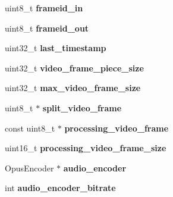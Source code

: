\begin{DoxyCompactItemize}
\item 
\hypertarget{struct___c_s_session_affc5ab5608c4d2dea8513fdc2b2cd6e6}{uint8\+\_\+t {\bfseries frameid\+\_\+in}}\label{struct___c_s_session_affc5ab5608c4d2dea8513fdc2b2cd6e6}

\item 
\hypertarget{struct___c_s_session_acea7b9bf7e58ed8e24980edeaacecc25}{uint8\+\_\+t {\bfseries frameid\+\_\+out}}\label{struct___c_s_session_acea7b9bf7e58ed8e24980edeaacecc25}

\item 
\hypertarget{struct___c_s_session_ab3eadf01045769905278f1908af23558}{uint32\+\_\+t {\bfseries last\+\_\+timestamp}}\label{struct___c_s_session_ab3eadf01045769905278f1908af23558}

\item 
\hypertarget{struct___c_s_session_af3563a0a96eb120a68e82d3135b6c49b}{uint32\+\_\+t {\bfseries video\+\_\+frame\+\_\+piece\+\_\+size}}\label{struct___c_s_session_af3563a0a96eb120a68e82d3135b6c49b}

\item 
\hypertarget{struct___c_s_session_a4de5a61c775468baabb35e2fcfaaa3a2}{uint32\+\_\+t {\bfseries max\+\_\+video\+\_\+frame\+\_\+size}}\label{struct___c_s_session_a4de5a61c775468baabb35e2fcfaaa3a2}

\item 
\hypertarget{struct___c_s_session_a100e5e445d6e9ff7775a1020dc780e56}{uint8\+\_\+t $\ast$ {\bfseries split\+\_\+video\+\_\+frame}}\label{struct___c_s_session_a100e5e445d6e9ff7775a1020dc780e56}

\item 
\hypertarget{struct___c_s_session_ae94ea43be63edb42efe44edae585064e}{const uint8\+\_\+t $\ast$ {\bfseries processing\+\_\+video\+\_\+frame}}\label{struct___c_s_session_ae94ea43be63edb42efe44edae585064e}

\item 
\hypertarget{struct___c_s_session_a7048faa402d6aecd2626ed85f352f5f2}{uint16\+\_\+t {\bfseries processing\+\_\+video\+\_\+frame\+\_\+size}}\label{struct___c_s_session_a7048faa402d6aecd2626ed85f352f5f2}

\item 
\hypertarget{struct___c_s_session_a8c1fa3d73f3426ba5cac83857c390ebc}{Opus\+Encoder $\ast$ {\bfseries audio\+\_\+encoder}}\label{struct___c_s_session_a8c1fa3d73f3426ba5cac83857c390ebc}

\item 
\hypertarget{struct___c_s_session_a8951572b99eec737269f5de96f9c5320}{int {\bfseries audio\+\_\+encoder\+\_\+bitrate}}\label{struct___c_s_session_a8951572b99eec737269f5de96f9c5320}


\end{DoxyCompactItemize}
